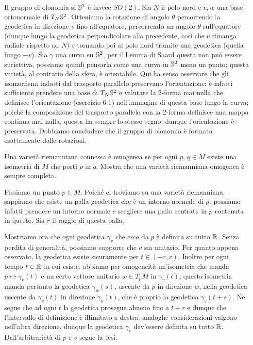 \documentclass[a4paper]{article}
\begin{document}
\begin{ex}[10.4]
	Il gruppo di olonomia si $ \S^2 $ è invece $ SO(2) $. Sia $ N $ il polo nord e $ v, w $ una base ortonormale di $ T_N\S^2 $. Otteniamo la rotazione di angolo $ \theta $ percorrendo la geodetica in direzione $ v $ fino all'equatore, percorrendo un angolo $ \theta $ sull'equatore (dunque lungo la geodetica perpendicolare alla precedente, così che $ v $ rimanga radiale rispetto ad $ N $) e tornando poi al polo nord tramite una geodetica (quella lungo $ -v $). Sia $ \gamma $ una curva su $ \S^2 $, per il Lemma di Saard questa non può essere suriettiva, possiamo quindi pensarla come una curva in $ \S^2 $ meno un punto; questa varietà, al contrario della sfera, è orientabile. Qui ha senso osservare che gli isomorfismi indotti dal trasporto parallelo preservano l'orientazione: è infatti sufficiente prendere una base di $ T_N\S^2 $ e valutare la 2-forma mai nulla che definisce l'orientazione (esercizio 6.1) nell'immagine di questa base lungo la curva; poiché la composizione del trasporto parallelo con la 2-forma definisce una mappa continua mai nulla, questa ha sempre lo stesso segno, dunque l'orientazione è preservata. Dobbiamo concludere che il gruppo di olonomia è formato esattamente dalle rotazioni.
\end{ex}

\begin{ex}[11.1]{Una varietà riemanniana connessa è omogenea se per ogni $ p,\, q \in M $ esiste una isometria di $ M $ che porti $ p $ in $ q $. Mostra che una varietà riemanniana omogenea è sempre completa.}
	
	Fissiamo un punto $ p \in M $. Poiché ci troviamo su una varietà riemanniana, sappiamo che esiste un palla geodetica che è un intorno normale di $ p $: possiamo infatti prendere un intorno normale e scegliere una palla centrata in $ p $ contenuta in questo. Sia $ r $ il raggio di questa palla.
	
	Mostriamo ora che ogni geodetica $ \gamma_v $ che esce da $ p $ è definita su tutto $ \R $. Senza perdita di generalità, possiamo supporre che $ v $ sia unitario. Per quanto appena osservato, la geodetica esiste sicuramente per $ t \in (-r, r) $. Inoltre per ogni tempo $ t \in \R $ in cui esiste, abbiamo per omogeneità  un'isometria che manda $ p \mapsto \gamma_v(t) $ e un certo vettore unitario $ w \in T_pM $ in $ \dot{\gamma}_v(t) $; questa isometria manda pertanto la geodetica $ \gamma_w(s) $, uscente da $ p $ in direzione $ w $, nella geodetica uscente da $ \gamma_v(t) $ in direzione $ \dot{\gamma}_v(t) $, che è proprio la geodetica $ \gamma_v(t+s) $. Ne segue che ad ogni $ t $ la geodetica prosegue almeno fino a $ t+r $ e dunque che l'intervallo di definizione è illimitato a destra; analoghe considerazioni valgono nell'altra direzione, dunque la geodetica $ \gamma_v $ dev'essere definita su tutto $ \R $. Dall'arbitrarietà di $ p $ e $ v $ segue la tesi.
	
\end{ex}
\end{document}
